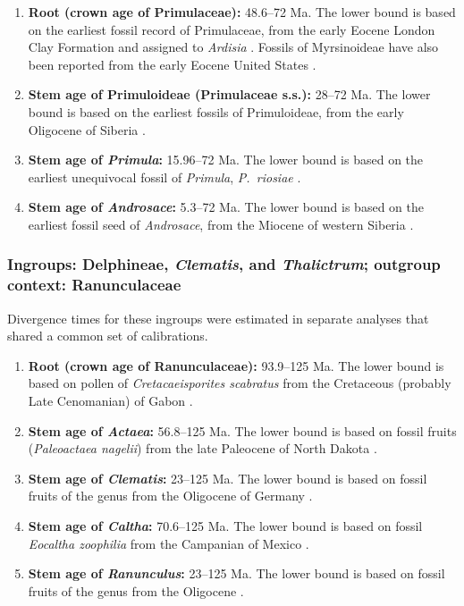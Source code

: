 \begin{enumerate}
\item \textbf{Root (crown age of Primulaceae):} 48.6--72 Ma. The lower
  bound is based on the earliest fossil record of Primulaceae, from
  the early Eocene London Clay Formation and assigned to
  \textit{Ardisia} \citep{Collinson1984}. Fossils of Myrsinoideae have
  also been reported from the early Eocene United States
  \citep{Irving1971}.

\item \textbf{Stem age of Primuloideae (Primulaceae s.s.):} 28--72
  Ma. The lower bound is based on the earliest fossils of
  Primuloideae, from the early Oligocene of Siberia
  \citep{Nikitin2006}.

\item \textbf{Stem age of \textit{Primula}:} 15.96--72 Ma. The lower
  bound is based on the earliest unequivocal fossil of
  \textit{Primula}, \textit{P.~riosiae} \citep{deVos2014}.

\item \textbf{Stem age of \textit{Androsace}:} 5.3--72 Ma. The lower
  bound is based on the earliest fossil seed of \textit{Androsace},
  from the Miocene of western Siberia \citep{Dorofeev1963}.
\end{enumerate}

\subsubsection*{Ingroups: Delphineae, \textit{Clematis}, and
  \textit{Thalictrum}; outgroup context: Ranunculaceae}

Divergence times for these ingroups were estimated in separate
analyses that shared a common set of calibrations.

\begin{enumerate}
\item \textbf{Root (crown age of Ranunculaceae):} 93.9--125 Ma. The
  lower bound is based on pollen of \textit{Cretacaeisporites
    scabratus} from the Cretaceous (probably Late Cenomanian) of Gabon
  \citep{Ward1994}.

\item \textbf{Stem age of \textit{Actaea}:} 56.8--125 Ma. The lower
  bound is based on fossil fruits (\textit{Paleoactaea nagelii}) from
  the late Paleocene of North Dakota \citep{Pigg2005}.

\item \textbf{Stem age of \textit{Clematis}:} 23--125 Ma. The lower
  bound is based on fossil fruits of the genus from the Oligocene of
  Germany \citep{Weyland1938}.

\item \textbf{Stem age of \textit{Caltha}:} 70.6--125 Ma. The lower
  bound is based on fossil \textit{Eocaltha zoophilia} from the
  Campanian of Mexico \citep{Rodriguez1998}.

\item \textbf{Stem age of \textit{Ranunculus}:} 23--125 Ma. The
  lower bound is based on fossil fruits of the genus from the
  Oligocene \citep{Mai1985}.

\end{enumerate}

